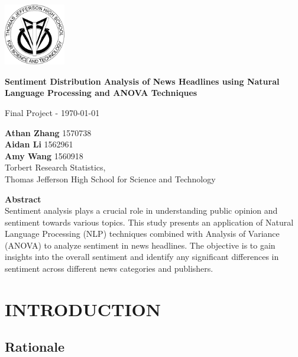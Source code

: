 \documentclass[12pt]{article}
\begin{document}
% 

\begin{titlepage}
\raggedright

\includegraphics[width=0.2\textwidth]{images/tjlogo.png}

\Huge 
\textbf{Sentiment Distribution Analysis of News Headlines using Natural Language Processing and ANOVA Techniques}

\vspace{0.5cm}
\small
Final Project - \today

\vspace{1.5cm}
\large
\textbf{Athan Zhang} \hfill 1570738 \\
\textbf{Aidan Li} \hfill 1562961 \\
\textbf{Amy Wang} \hfill 1560918 \\

\vspace{1cm}
\small
Torbert Research Statistics,\\
Thomas Jefferson High School for Science and Technology

\vfill
\large
\textbf{Abstract} \\
\vspace{0.25cm}
\small
Sentiment analysis plays a crucial role in understanding public opinion and sentiment towards various topics. This study presents an application of Natural Language Processing (NLP) techniques combined with Analysis of Variance (ANOVA) to analyze sentiment in news headlines. The objective is to gain insights into the overall sentiment and identify any significant differences in sentiment across different news categories and publishers.

\vspace*{1cm}


\end{titlepage}

\tableofcontents
\newpage

\section{INTRODUCTION}

\subsection{Rationale}
\end{document}
